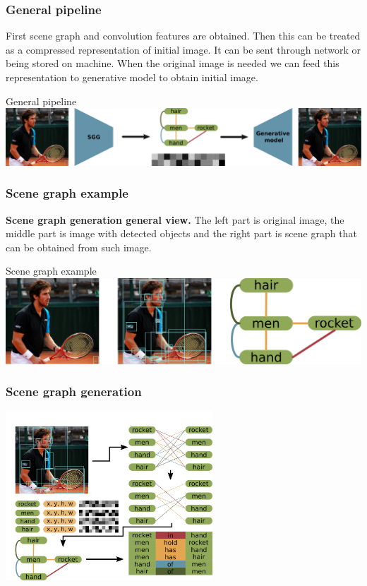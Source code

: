 \documentclass[10pt]{beamer}
\begin{document}
\begin{frame}
    \frametitle{General pipeline}
    First scene graph and convolution features are obtained. Then this can be treated as a compressed representation of initial image. It can be sent through network or being stored on machine. When the original image is needed we can feed this representation to generative model to obtain initial image.
    \begin{block}{General pipeline}
        \includegraphics[width=\textwidth]{figure/application-general-pipeline.png}
    \end{block}
\end{frame}

\begin{frame}
    \frametitle{Scene graph example}
    \textbf{Scene graph generation general view.} The left part is original image, the middle part is image with detected objects and the right part is scene graph that can be obtained from such image.
    \begin{block}{Scene graph example}
        \includegraphics[width=\textwidth]{figure/scene-graph-example.png}
    \end{block}
\end{frame}

\begin{frame}
    \frametitle{Scene graph generation}
    \centering
    \includegraphics[height=180pt]{figure/sgg-pipeline.png}
\end{frame}
\end{document}
